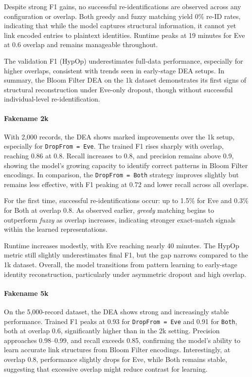 Despite strong F1 gains, no successful re-identifications are observed across any configuration or overlap.
Both greedy and fuzzy matching yield 0\% re-ID rates, indicating that while the model captures structural information, it cannot yet link encoded entries to plaintext identities.
Runtime peaks at 19 minutes for Eve at 0.6 overlap and remains manageable throughout.

The validation F1 (HypOp) underestimates full-data performance, especially for higher overlaps, consistent with trends seen in early-stage DEA setups.
In summary, the Bloom Filter DEA on the 1k dataset demonstrates its first signs of structural reconstruction under Eve-only dropout, though without successful individual-level re-identification.

\paragraph{Fakename 2k}

With 2{,}000 records, the DEA shows marked improvements over the 1k setup, especially for \texttt{DropFrom = Eve}.
The trained F1 rises sharply with overlap, reaching 0.86 at 0.8.
Recall increases to 0.8, and precision remains above 0.9, showing the model's growing capacity to identify correct patterns in Bloom Filter encodings.
In comparison, the \texttt{DropFrom = Both} strategy improves slightly but remains less effective, with F1 peaking at 0.72 and lower recall across all overlaps.

For the first time, successful re-identifications occur: up to 1.5\% for Eve and 0.3\% for Both at overlap 0.8.
As observed earlier, \emph{greedy} matching begins to outperform \emph{fuzzy} as overlap increases, indicating stronger exact-match signals within the learned representations.

Runtime increases modestly, with Eve reaching nearly 40 minutes.
The HypOp metric still slightly underestimates final F1, but the gap narrows compared to the 1k dataset.
Overall, the model transitions from pattern learning to early-stage identity reconstruction, particularly under asymmetric dropout and high overlap.


\paragraph{Fakename 5k}

On the 5{,}000-record dataset, the DEA shows strong and increasingly stable performance.
Trained F1 peaks at 0.93 for \texttt{DropFrom = Eve} and 0.91 for \texttt{Both}, both at overlap 0.6, significantly higher than in the 2k setting.
Precision approaches 0.98–0.99, and recall exceeds 0.85, confirming the model's ability to learn accurate link structures from Bloom Filter encodings.
Interestingly, at overlap 0.8, performance slightly drops for Eve, while Both remains stable, suggesting that excessive overlap might reduce contrast for learning.

